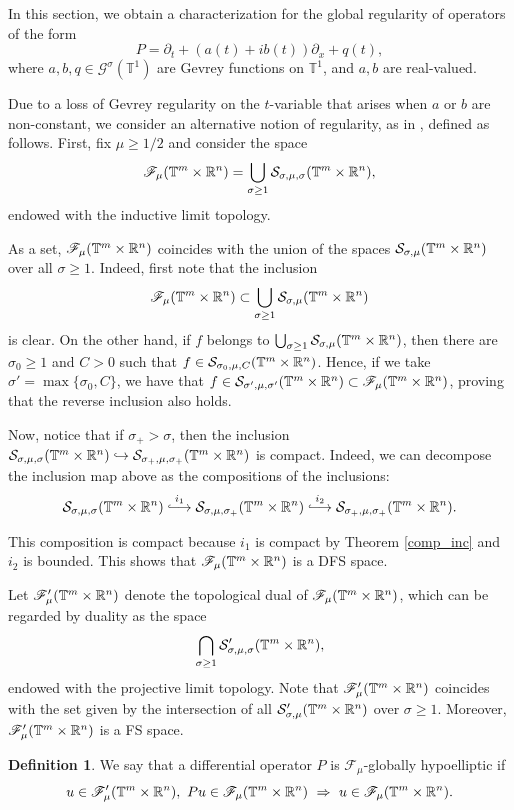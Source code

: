 \documentclass[11pt,reqno]{amsart}
\numberwithin{equation}{section}
\theoremstyle{definition}
\theoremstyle{definition}
\newtheorem{definition}[theorem]{Definition}
\newcommand{\T}{\mathbb{T}}
\newcommand{\G}{\mathnormal{\mathbb{T}^{m}\times\mathbb{R}^n}}
\renewcommand{\S}{\mathcal{S}_{\sigma,\mu}(\G)}
\newcommand{\longhookrightarrow}{\lhook\joinrel\longrightarrow}
\begin{document}
In this section, we obtain a characterization for the global regularity of operators of the form
\[P=\partial_t + (a(t)+ib(t))\partial_x + q(t),\]
where $a,b,q\in\mathscr{G}^\sigma(\T^1)$ are Gevrey functions on $\T^1$, and $a,b$ are real-valued.

Due to a loss of Gevrey regularity on the $t$-variable that arises when $a$ or $b$ are non-constant, we consider an alternative notion of regularity, as in  \cite{AvCap2022}, defined as follows. First, fix $\mu\geq 1/2$ and consider the space
\[\mathscr{F}_\mu(\G) = \bigcup_{\sigma\geq 1}\mathcal{S}_{\sigma,\mu,\sigma}(\G),\]
endowed with the inductive limit topology.

As a set, $\mathscr{F}_\mu(\G)$ coincides with the union of the spaces $\S$ over all $\sigma\geq 1$. Indeed, first note that the inclusion
\[\mathscr{F}_\mu(\G)\subset \bigcup_{\sigma\geq 1}\S\]
is clear. On the other hand, if $f$ belongs to $\bigcup_{\sigma\geq 1}\S$, then there are $\sigma_0\geq 1$ and $C>0$ such that $f\in\mathcal{S}_{\sigma_0,\mu,C}(\G)$. Hence, if we take $\sigma'=\max\{\sigma_0,C\}$, we have that $f\in\mathcal{S}_{\sigma',\mu,\sigma'}(\G)\subset \mathscr{F}_\mu(\G)$, proving that the reverse inclusion also holds.

Now, notice that if $\sigma_+>\sigma$, then the inclusion $\mathcal{S}_{\sigma,\mu,\sigma}(\G)\hookrightarrow \mathcal{S}_{\sigma_+,\mu,\sigma_+}(\G)$ is compact. Indeed, we can decompose the inclusion map above as the compositions of the inclusions:
\[\mathcal{S}_{\sigma,\mu,\sigma}(\G) \overset{i_1}{\longhookrightarrow} \mathcal{S}_{\sigma,\mu,\sigma_+}(\G) \overset{i_2}{\longhookrightarrow} \mathcal{S}_{\sigma_+,\mu,\sigma_+}(\G).\]

This composition is compact because $i_1$ is compact by Theorem \ref{comp_inc} and $i_2$ is bounded. This shows that $\mathscr{F}_\mu(\G)$ is a DFS space.

Let $\mathscr{F}'_\mu(\G)$ denote the topological dual of $\mathscr{F}_\mu(\G)$, which can be regarded by duality as the space
\[\bigcap_{\sigma\geq 1}\mathcal{S}'_{\sigma,\mu,\sigma}(\G),\]
endowed with the projective limit topology. Note that  $\mathscr{F}'_\mu(\G)$ coincides with the set given by the intersection of all $\mathcal{S}'_{\sigma,\mu}(\G)$ over $\sigma\geq 1$. Moreover, $\mathscr{F}'_\mu(\G)$ is a FS space. 

\begin{definition}\label{Fmu_GH_def}
    We say that a differential operator $P$ is $\mathscr{F}_\mu$-globally hypoelliptic if
    \[u\in\mathscr{F}'_\mu(\G),\ Pu\in\mathscr{F}_\mu(\G)\ \Rightarrow\ u\in\mathscr{F}_\mu(\G).\]
\end{definition}
\end{document}
